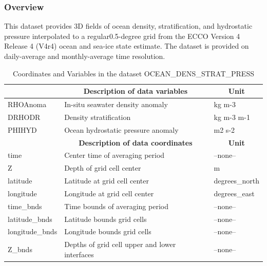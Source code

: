 \subsubsection{Overview}
This dataset provides 3D fields of ocean density, stratification, and hydrostatic pressure interpolated to a regular0.5-degree grid from the ECCO Version 4 Release 4 (V4r4) ocean and sea-ice state estimate. The dataset is provided on daily-average and monthly-average time resolution. 
\begin{longtable}{|m{}|m{}|m{}|}
\caption{Coordinates and Variables in the dataset OCEAN\_DENS\_STRAT\_PRESS}
\label{tab:table-OCEAN_DENS_STRAT_PRESS-fields} \\ 
\hline \endhead \hline \endfoot
\rowcolor{lightgray} \multicolumn{1}{|c|}{\textbf{Variables}} & \multicolumn{1}{|c|}{\textbf{Description of data variables}} &  \multicolumn{1}{|c|}{\textbf{Unit}}\\ \hline
RHOAnoma &In-situ seawater density anomaly &kg m-3  \\ \hline
DRHODR &Density stratification &kg m-3 m-1  \\ \hline
PHIHYD &Ocean hydrostatic pressure anomaly &m2 s-2  \\ \hline
\rowcolor{lightgray} \multicolumn{1}{|c|}{\textbf{Coordinates}} & \multicolumn{1}{|c|}{\textbf{Description of data coordinates}} &  \multicolumn{1}{|c|}{\textbf{Unit}}\\ \hline
time &Center time of averaging period &--none--  \\ \hline
Z &Depth of grid cell center &m  \\ \hline
latitude &Latitude at grid cell center &degrees\_north  \\ \hline
longitude &Longitude at grid cell center &degrees\_east  \\ \hline
time\_bnds &Time bounds of averaging period &--none--  \\ \hline
latitude\_bnds &Latitude bounds grid cells &--none--  \\ \hline
longitude\_bnds &Longitude bounds grid cells &--none--  \\ \hline
Z\_bnds &Depths of grid cell upper and lower interfaces &--none--  \\ \hline
\end{longtable}

\newp
\pagebreak
